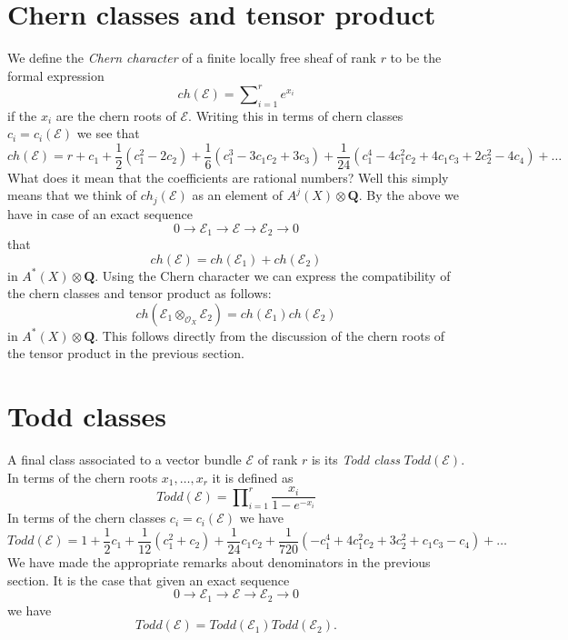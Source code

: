 \section{Chern classes and tensor product}
\label{section-chern-classes-tensor}

\noindent
We define the {\it Chern character} of a finite locally free
sheaf of rank $r$ to be the formal expression
$$
ch({\mathcal E}) = \sum\nolimits_{i=1}^r e^{x_i}
$$
if the $x_i$ are the chern roots of ${\mathcal E}$. Writing this in
terms of chern classes $c_i = c_i(\mathcal{E})$
we see that
$$
ch(\mathcal{E}) =
r
+
c_1
+
\frac{1}{2}(c_1^2 - 2c_2)
+
\frac{1}{6}(c_1^3 - 3c_1c_2 + 3c_3)
+
\frac{1}{24}(c_1^4 - 4c_1^2c_2 + 4c_1c_3 + 2c_2^2 - 4c_4)
+
\ldots
$$
What does it mean that the coefficients are rational numbers?
Well this simply means that we think of
$ch_j(\mathcal{E})$ as an element of $A^j(X) \otimes \mathbf{Q}$.
By the above we have in case of an exact sequence
$$
0 \to \mathcal{E}_1 \to \mathcal{E} \to \mathcal{E}_2 \to 0
$$
that
$$
ch(\mathcal{E}) = ch(\mathcal{E}_1) + ch(\mathcal{E}_2)
$$
in $A^*(X) \otimes \mathbf{Q}$.
Using the Chern character we can express the compatibility
of the chern classes and tensor product as follows:
$$
ch(\mathcal{E}_1 \otimes_{\mathcal{O}_X} \mathcal{E}_2) =
ch(\mathcal{E}_1) ch(\mathcal{E}_2)
$$
in $A^*(X) \otimes \mathbf{Q}$.
This follows directly from the discussion of the chern roots
of the tensor product in the previous section.




\section{Todd classes}
\label{section-todd-classes}

\noindent
A final class associated to a vector bundle $\mathcal{E}$
of rank $r$ is its {\it Todd class} $Todd(\mathcal{E})$.
In terms of the chern roots $x_1, \ldots, x_r$ it is
defined as
$$
Todd(\mathcal{E})
=
\prod\nolimits_{i = 1}^r
\frac{x_i}{1 - e^{-x_i}}
$$
In terms of the chern classes $c_i = c_i(\mathcal{E})$
we have
$$
Todd(\mathcal{E})
=
1
+
\frac{1}{2}c_1
+
\frac{1}{12}(c_1^2 + c_2)
+
\frac{1}{24}c_1c_2
+
\frac{1}{720}(-c_1^4 + 4c_1^2c_2 + 3c_2^2 + c_1c_3 - c_4)
+
\ldots
$$
We have made the appropriate remarks about denominators
in the previous section. It is the case that
given an exact sequence
$$
0
\to
{\mathcal E}_1
\to
{\mathcal E}
\to
{\mathcal E}_2
\to
0
$$
we have
$$
Todd({\mathcal E}) = Todd({\mathcal E}_1) Todd({\mathcal E}_2).
$$




